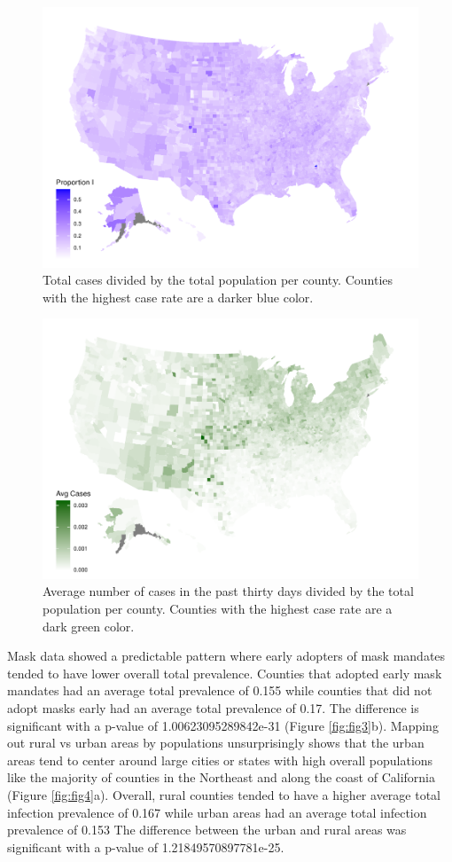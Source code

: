 \documentclass[
  12pt,
]{article}
\begin{document}
\begin{figure}[H]

{\centering \includegraphics[width=0.7\linewidth,]{Final-Manuscript_files/figure-latex/fig1-1} 

}

\caption{Total cases divided by the total population per county. Counties with the highest case rate are a darker blue color.}\label{fig:fig1}
\end{figure}



\begin{figure}[H]

{\centering \includegraphics[width=0.7\linewidth,]{Final-Manuscript_files/figure-latex/fig2-1} 

}

\caption{Average number of cases in the past thirty days divided by the total population per county. Counties with the highest case rate are a dark green color.}\label{fig:fig2}
\end{figure}

Mask data showed a predictable pattern where early adopters of mask mandates tended to have lower overall total prevalence. Counties that adopted early mask mandates had an average total prevalence of 0.155 while counties that did not adopt masks early had an average total prevalence of 0.17. The difference is significant with a p-value of 1.00623095289842e-31 (Figure \ref{fig:fig3}b). Mapping out rural vs urban areas by populations unsurprisingly shows that the urban areas tend to center around large cities or states with high overall populations like the majority of counties in the Northeast and along the coast of California (Figure \ref{fig:fig4}a). Overall, rural counties tended to have a higher average total infection prevalence of 0.167 while urban areas had an average total infection prevalence of 0.153 The difference between the urban and rural areas was significant with a p-value of 1.21849570897781e-25.
\end{document}
